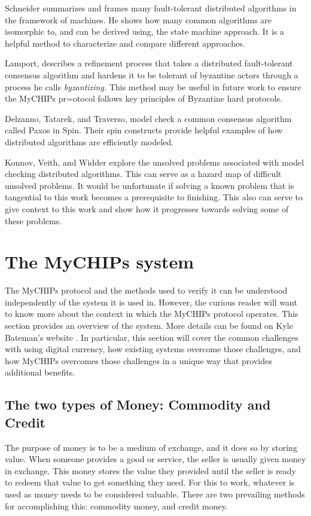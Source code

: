 \documentclass[runningheads]{llncs}
\begin{document}
 
 Schneider summarizes and frames many fault-tolerant distributed algorithms in the framework of  machines\cite{StateMachine}. He shows how many common algorithms are isomorphic to, and can be derived using, the state machine approach. It is a helpful method to characterize and compare different approaches.
 
 Lamport\cite{Lamport}, describes a refinement process that takes a distributed fault-tolerant consensus algorithm and hardens it to be tolerant of byzantine actors through a process he calls \emph{byzantizing.} This method may be useful in future work to ensure the MyCHIPs pr=otocol follows key principles of Byzantine hard protocols.
 
 Delzanno, Tatarek, and Traverso, model check a common consensus algorithm called Paxos in Spin. Their spin constructs provide helpful examples of how distributed algorithms are efficiently modeled.\cite{Delzanno_2014}
 
 Konnov, Veith, and Widder explore the unsolved problems associated with model checking distributed algorithms. This can serve as a hazard map of difficult unsolved problems. It would be unfortunate if solving a known problem that is tangential to this work becomes a prerequisite to finishing. This also can serve to give context to this work and show how it progresses towards solving some of these problems.\cite{Konnov}

\appendix

\section{The MyCHIPs system}
\label{apdx:mychips}
The MyCHIPs protocol and the methods used to verify it can be understood independently of the system it is used in. However, the curious reader will want to know more about the context in which the MyCHIPs protocol operates. This section provides an overview of the system. More details can be found on Kyle Bateman's website \cite{bateman_myCHIPs}. 
In particular, this section will cover the common challenges with using digital currency, how existing systems overcome those challenges, and how MyCHIPs overcomes those challenges in a unique way that provides additional benefits. 

\subsection{The two types of Money: Commodity and Credit}
The purpose of money is to be a medium of exchange, and it does so by storing value. When someone provides a good or service, the seller is usually given money in exchange. This money stores the value they provided until the seller is ready to redeem that value to get something they need.
For this to work, whatever is used as money needs to be considered valuable. There are two prevailing methods for accomplishing this: commodity money, and credit money. 
\end{document}
